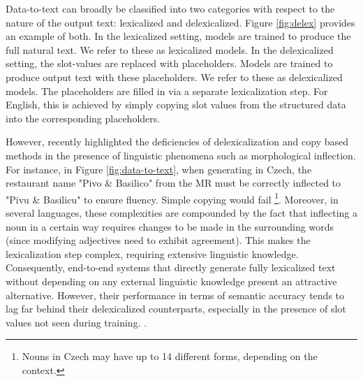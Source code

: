 \documentclass[11pt,a4paper]{article}
\begin{document}
Data-to-text can broadly be classified into two categories with respect to the nature of the output text: lexicalized and delexicalized. Figure \ref{fig:delex}  provides an example of both. In the lexicalized setting, models are trained to produce the full natural text. We refer to these as lexicalized models. In the delexicalized setting, the slot-values are replaced with placeholders. Models are trained to produce output text with these placeholders. We refer to these as delexicalized models. The placeholders are filled in via a separate lexicalization step. For English, this is achieved by simply copying slot values from the structured data into the corresponding placeholders. \par
However, \citet{duvsek2019neural} recently highlighted the deficiencies of delexicalization and copy based methods in the presence of linguistic phenomena such as morphological inflection. For instance, in Figure \ref{fig:data-to-text}, when generating in Czech, the restaurant name "Pivo \& Basilico" from the MR must be correctly inflected to "Pivu \& Basilicu" to ensure fluency. Simple copying would fail \footnote{Nouns in Czech may have up to 14 different forms, depending on the context.}.  Moreover, in several languages, these complexities are compounded by the fact that inflecting a noun in a certain way requires changes to be made in the surrounding words (since modifying adjectives need to exhibit agreement).  This makes the lexicalization step complex, requiring extensive linguistic knowledge. Consequently, end-to-end systems that directly generate fully lexicalized text without depending on any external linguistic knowledge present an attractive alternative. However, their performance in terms of semantic accuracy tends to lag far behind their delexicalized counterparts, especially in the presence of slot values not seen during training. \citep{shimorina2018handling}. \par
\end{document}
